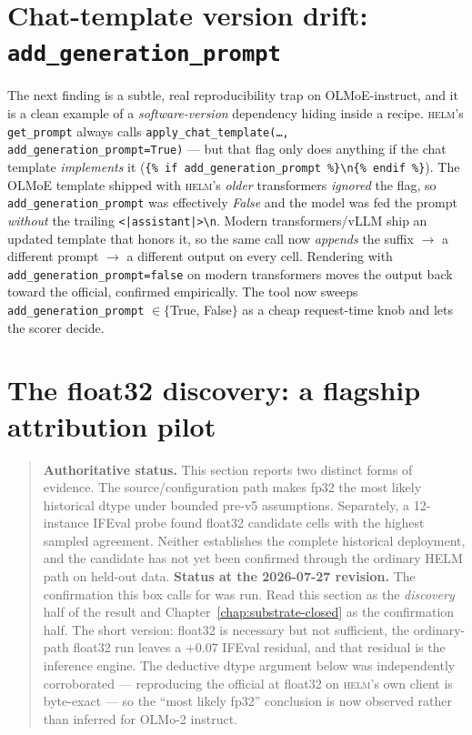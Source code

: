 \documentclass[11pt]{report}
\newcommand{\code}[1]{\texttt{#1}}
\newcommand{\evidencebox}[2]{\begin{quote}\noindent\textbf{#1.} #2\end{quote}}
\begin{document}
\section{Chat-template version drift: \code{add\_generation\_prompt}}
\label{sec:addgenprompt}

The next finding is a subtle, real reproducibility trap on OLMoE-instruct, and it
is a clean example of a \emph{software-version} dependency hiding inside a recipe.
\textsc{helm}'s \code{get\_prompt} always calls
\code{apply\_chat\_template(\ldots, add\_generation\_prompt=True)} --- but that flag
only does anything if the chat template \emph{implements} it
(\code{\{\% if add\_generation\_prompt \%\}<|assistant|>\textbackslash n\{\% endif \%\}}).
The OLMoE template shipped with \textsc{helm}'s \emph{older} transformers
\emph{ignored} the flag, so \code{add\_generation\_prompt} was effectively
\emph{False} and the model was fed the prompt \emph{without} the trailing
\code{<|assistant|>\textbackslash n}. Modern transformers/vLLM ship an updated
template that honors it, so the same call now \emph{appends} the suffix
$\rightarrow$ a different prompt $\rightarrow$ a different output on every cell.
Rendering with \code{add\_generation\_prompt=false} on modern transformers moves
the output back toward the official, confirmed empirically. The tool now sweeps
\code{add\_generation\_prompt} $\in \{$True, False$\}$ as a cheap request-time knob
and lets the scorer decide.

\section{The float32 discovery: a flagship attribution pilot}
\label{sec:fp32}

\evidencebox{Authoritative status}{This section reports two distinct forms of
evidence. The source/configuration path makes fp32 the most likely historical dtype
under bounded pre-v5 assumptions. Separately, a 12-instance IFEval probe found
float32 candidate cells with the highest sampled agreement. Neither establishes the
complete historical deployment, and the candidate has not yet been confirmed through
the ordinary HELM path on held-out data.
\newline\newline
\textbf{Status at the 2026-07-27 revision.} The confirmation this box calls for was
run. Read this section as the \emph{discovery} half of the result and
Chapter~\ref{chap:substrate-closed} as the confirmation half. The short version:
float32 is necessary but not sufficient, the ordinary-path float32 run leaves a
$+0.07$ IFEval residual, and that residual is the inference engine. The deductive
dtype argument below was independently corroborated --- reproducing the official at
float32 on \textsc{helm}'s own client is byte-exact --- so the ``most likely fp32''
conclusion is now observed rather than inferred for OLMo-2 instruct.}
\end{document}
